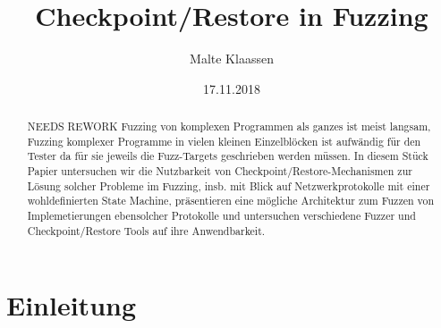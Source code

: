 \documentclass[a4paper]{article}
\begin{document}
\author{Malte Klaassen}
\date{17.11.2018}
\title{Checkpoint/Restore in Fuzzing}

\maketitle

\begin{abstract}
    NEEDS REWORK Fuzzing von komplexen Programmen als ganzes ist meist langsam, Fuzzing komplexer Programme in vielen kleinen Einzelblöcken ist aufwändig für den Tester da für sie jeweils die Fuzz-Targets geschrieben werden müssen. In diesem Stück Papier untersuchen wir die Nutzbarkeit von Checkpoint/Restore-Mechanismen zur Lösung solcher Probleme im Fuzzing, insb. mit Blick auf Netzwerkprotokolle mit einer wohldefinierten State Machine, präsentieren eine mögliche Architektur zum Fuzzen von Implemetierungen ebensolcher Protokolle und untersuchen verschiedene Fuzzer und Checkpoint/Restore Tools auf ihre Anwendbarkeit.
\end{abstract}

\tableofcontents

\section{Einleitung}
\end{document}
